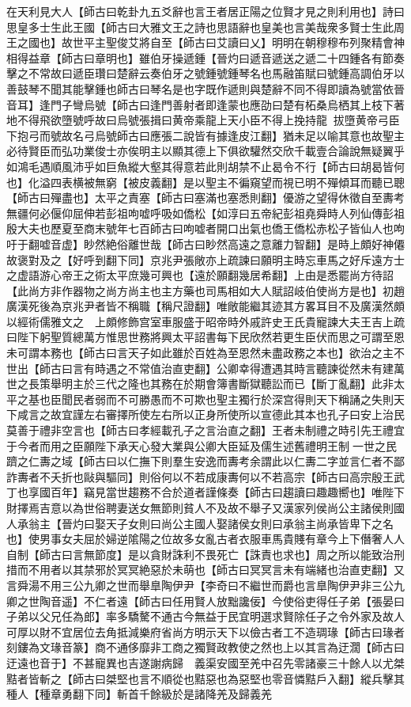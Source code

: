 在天利見大人【師古曰乾卦九五爻辭也言王者居正陽之位賢才見之則利用也】詩曰思皇多士生此王國【師古曰大雅文王之詩也思語辭也皇美也言美哉衆多賢士生此周王之國也】故世平主聖俊艾將自至【師古曰艾讀曰乂】明明在朝穆穆布列聚精會神相得益章【師古曰章明也】雖伯牙操遞鍾【晉灼曰遞音遞送之遞二十四鍾各有節奏擊之不常故曰遞臣瓚曰楚辭云奏伯牙之號鍾號鍾琴名也馬融笛賦曰號鍾高調伯牙以善鼓琴不聞其能擊鍾也師古曰琴名是也字既作遞則與楚辭不同不得即讀為號當依晉音耳】逢門子彎烏號【師古曰逢門善射者即逢蒙也應劭曰楚有柘桑烏栖其上枝下著地不得飛欲墮號呼故曰烏號張揖曰黄帝乘龍上天小臣不得上挽持龍拔墮黄帝弓臣下抱弓而號故名弓烏號師古曰應張二說皆有據逢皮江翻】猶未足以喻其意也故聖主必待賢臣而弘功業俊士亦俟明主以顯其德上下俱欲驩然交欣千載壹合論說無疑翼乎如鴻毛遇順風沛乎如巨魚縱大壑其得意若此則胡禁不止曷令不行【師古曰胡曷皆何也】化溢四表横被無窮【被皮義翻】是以聖主不徧窺望而視已明不殫傾耳而聽已聰【師古曰殫盡也】太平之責塞【師古曰塞滿也塞悉則翻】優游之望得休徵自至夀考無疆何必偃仰屈伸若彭祖呴嘘呼吸如僑松【如淳曰五帝紀彭祖堯舜時人列仙傳彭祖殷大夫也歷夏至商末號年七百師古曰呴嘘者開口出氣也僑王僑松赤松子皆仙人也呴吁于翻嘘音虚】眇然絶俗離世哉【師古曰眇然高遠之意離力智翻】是時上頗好神僊故褒對及之【好呼到翻下同】京兆尹張敞亦上疏諫曰願明主時忘車馬之好斥遠方士之虚語游心帝王之術太平庶幾可興也【遠於願翻幾居希翻】上由是悉罷尚方待詔【此尚方非作器物之尚方尚主也主方藥也司馬相如大人賦詔岐伯使尚方是也】初趙廣漢死後為京兆尹者皆不稱職【稱尺證翻】唯敞能繼其迹其方畧耳目不及廣漢然頗以經術儒雅文之　上頗修飾宫室車服盛于昭帝時外戚許史王氏貴寵諫大夫王吉上疏曰陛下躬聖質總萬方惟思世務將興太平詔書每下民欣然若更生臣伏而思之可謂至恩未可謂本務也【師古曰言天子如此雖於百姓為至恩然未盡政務之本也】欲治之主不世出【師古曰言有時遇之不常值治直吏翻】公卿幸得遭遇其時言聽諫從然未有建萬世之長策舉明主於三代之隆也其務在於期會簿書斷獄聽訟而已【斷丁亂翻】此非太平之基也臣聞民者弱而不可勝愚而不可欺也聖主獨行於深宫得則天下稱誦之失則天下咸言之故宜謹左右審擇所使左右所以正身所使所以宣德此其本也孔子曰安上治民莫善于禮非空言也【師古曰孝經載孔子之言治直之翻】王者未制禮之時引先王禮宜于今者而用之臣願陛下承天心發大業與公卿大臣延及儒生述舊禮明王制一世之民躋之仁夀之域【師古曰以仁撫下則羣生安逸而夀考余謂此以仁夀二字並言仁者不鄙詐夀者不夭折也敺與驅同】則俗何以不若成康夀何以不若高宗【師古曰高宗殷王武丁也享國百年】竊見當世趨務不合於道者謹條奏【師古曰趨讀曰趣趣嚮也】唯陛下財擇焉吉意以為世俗聘妻送女無節則貧人不及故不舉子又漢家列侯尚公主諸侯則國人承翁主【晉灼曰娶天子女則曰尚公主國人娶諸侯女則曰承翁主尚承皆卑下之名也】使男事女夫屈於婦逆隂陽之位故多女亂古者衣服車馬貴賤有章今上下僭奢人人自制【師古曰言無節度】是以貪財誅利不畏死亡【誅責也求也】周之所以能致治刑措而不用者以其禁邪於冥冥絶惡於未萌也【師古曰冥冥言未有端緒也治直吏翻】又言舜湯不用三公九卿之世而舉臯陶伊尹【李奇曰不繼世而爵也言臯陶伊尹非三公九卿之世陶音遥】不仁者遠【師古曰任用賢人放黜讒佞】今使俗吏得任子弟【張晏曰子弟以父兄任為郎】率多驕驁不通古今無益于民宜明選求賢除任子之令外家及故人可厚以財不宜居位去角抵減樂府省尚方明示天下以儉古者工不造琱瑑【師古曰瑑者刻鏤為文瑑音篆】商不通侈靡非工商之獨賢政教使之然也上以其言為迂濶【師古曰迂遠也音于】不甚寵異也吉遂謝病歸　義渠安國至羌中召先零諸豪三十餘人以尤桀黠者皆斬之【師古曰桀堅也言不順從也黠惡也為惡堅也零音憐黠戶入翻】縱兵擊其種人【種章勇翻下同】斬首千餘級於是諸降羌及歸義羌